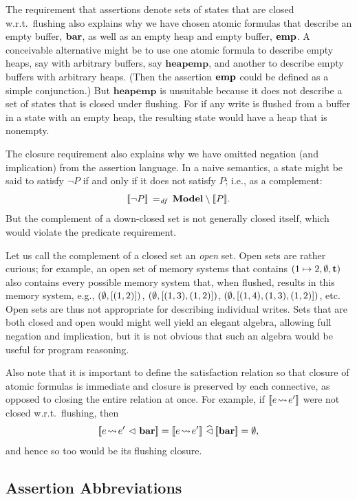 \documentclass[11pt]{report}
\begin{document}
The requirement that assertions denote sets of states that are closed w.r.t.~flushing also explains why we have chosen atomic formulas that describe an empty buffer, $\mathbf{bar}$, as well as an empty heap and empty buffer, $\mathbf{emp}$. A conceivable alternative might be to use one atomic formula to describe empty heaps, say with arbitrary buffers, say $\mathbf{heapemp}$, and another to describe empty buffers with arbitrary heaps. (Then the assertion $\mathbf{emp}$ could be defined as a simple conjunction.) But $\mathbf{heapemp}$ is unsuitable because it does not describe a set of states that is closed under flushing. For if any write is flushed from a buffer in a state with an empty heap, the resulting state would have a heap that is nonempty. 

The closure requirement also explains why we have omitted negation (and implication) from the assertion language. In a naive semantics, a state might be said to satisfy $\neg P$ if and only if it does not satisfy $P$; i.e., as a complement: \[ [\![\neg P]\!] \operatorname{\;=_{\mathit{df}}\;} \mathbf{Model} \setminus [\![P]\!]. \] But the complement of a down-closed set is not generally closed itself, which would violate the predicate requirement. 

Let us call the complement of a closed set an \emph{open} set. Open sets are rather curious; for example, an open set of memory systems that contains $(1 \mapsto 2,\operatorname{\emptyset},\mathbf{t})$ also contains every possible memory system that, when flushed, results in this memory system, e.g., $(\operatorname{\emptyset}, \left[(1,2)\right])$, $(\operatorname{\emptyset}, \left[(1,3),(1,2)\right])$, $(\operatorname{\emptyset}, \left[(1,4),(1,3),(1,2)\right])$, etc. Open sets are thus not appropriate for describing individual writes. Sets that are both closed and open would might well yield an elegant algebra, allowing full negation and implication, but it is not obvious that such an algebra would be useful for program reasoning. 

Also note that it is important to define the satisfaction relation so that closure of atomic formulas is immediate and closure is preserved by each connective, as opposed to closing the entire relation at once. For example, if $[\![e \!\leadsto\! e']\!]$ were not closed w.r.t.~flushing, then \[\pred{e \fwriteu e' \fseq \fbaru} = \pred{e \fwriteu e'} \mseq \pred{\fbaru} = \nil,\] and hence so too would be its flushing closure.  

\subsection{Assertion Abbreviations}
\label{sec:uniprocessor-abbreviations} 
\end{document}
